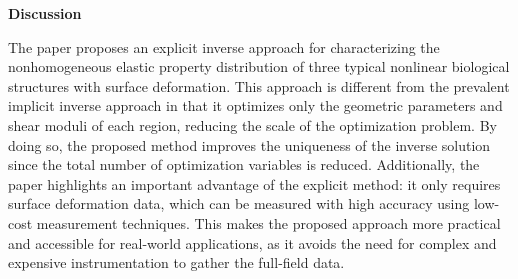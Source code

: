 \documentclass[11pt]{article}
\begin{document}
\vspace{0.5em}

\noindent\textbf{Discussion}

\vspace{0.3em}

\noindent
The paper proposes an explicit inverse approach for
characterizing the nonhomogeneous elastic property distribution
of three typical nonlinear biological structures with surface
deformation. This approach is different from the prevalent
implicit inverse approach in that it optimizes only the
geometric parameters and shear moduli of each region, reducing
the scale of the optimization problem. By doing so, the proposed
method improves the uniqueness of the inverse solution since the
total number of optimization variables is reduced. Additionally,
the paper highlights an important advantage of the explicit
method: it only requires surface deformation data, which can be
measured with high accuracy using low-cost measurement
techniques. This makes the proposed approach more practical and
accessible for real-world applications, as it avoids the need
for complex and expensive instrumentation to gather the
full-field data.

\vspace{0.8em}
\end{document}
